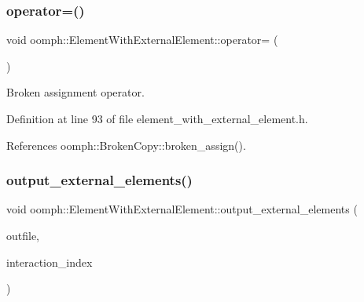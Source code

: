 \mbox{\label{classoomph_1_1ElementWithExternalElement_a2062e7f53cd53e6524658f5081eb211b}} 
\subsubsection{\texorpdfstring{operator=()}{operator=()}}
{\footnotesize\ttfamily void oomph\+::\+Element\+With\+External\+Element\+::operator= (\begin{DoxyParamCaption}\item[{const \hyperlink{classoomph_1_1ElementWithExternalElement}{Element\+With\+External\+Element} \&}]{ }\end{DoxyParamCaption})\hspace{0.3cm}{\ttfamily [inline]}}



Broken assignment operator. 



Definition at line 93 of file element\+\_\+with\+\_\+external\+\_\+element.\+h.



References oomph\+::\+Broken\+Copy\+::broken\+\_\+assign().

\mbox{\label{classoomph_1_1ElementWithExternalElement_a081a1881e0e5844e731178f277c17f1c}} 
\subsubsection{\texorpdfstring{output\+\_\+external\+\_\+elements()}{output\_external\_elements()}}
{\footnotesize\ttfamily void oomph\+::\+Element\+With\+External\+Element\+::output\+\_\+external\+\_\+elements (\begin{DoxyParamCaption}\item[{std\+::ostream \&}]{outfile,  }\item[{const unsigned \&}]{interaction\+\_\+index }\end{DoxyParamCaption})}



